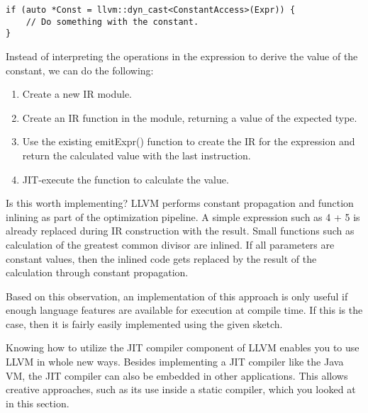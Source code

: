 \begin{lstlisting}[caption={}]
if (auto *Const = llvm::dyn_cast<ConstantAccess>(Expr)) {
	// Do something with the constant.
}
\end{lstlisting}

Instead of interpreting the operations in the expression to derive the value of the constant, we can do the following:\par

\begin{enumerate}
\item Create a new IR module.

\item Create an IR function in the module, returning a value of the expected type.

\item Use the existing emitExpr() function to create the IR for the expression and return the calculated value with the last instruction.

\item JIT-execute the function to calculate the value.
\end{enumerate}

Is this worth implementing? LLVM performs constant propagation and function inlining as part of the optimization pipeline. A simple expression such as 4 + 5 is already replaced during IR construction with the result. Small functions such as calculation of the greatest common divisor are inlined. If all parameters are constant values, then the inlined code gets replaced by the result of the calculation through constant propagation.\par

Based on this observation, an implementation of this approach is only useful if enough language features are available for execution at compile time. If this is the case, then it is fairly easily implemented using the given sketch.\par

Knowing how to utilize the JIT compiler component of LLVM enables you to use LLVM in whole new ways. Besides implementing a JIT compiler like the Java VM, the JIT compiler can also be embedded in other applications. This allows creative approaches, such as its use inside a static compiler, which you looked at in this section.\par





















